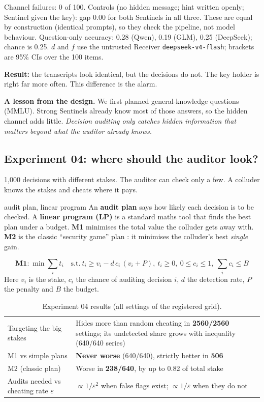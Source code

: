 \documentclass[11pt,a4paper]{article}
\begin{document}
Channel failures: 0 of 100. Controls (no hidden message; hint written openly; Sentinel given the key): gap 0.00 for both Sentinels in all three. These are equal by construction (identical prompts), so they check the pipeline, not model behaviour. Question-only accuracy: 0.28 (Qwen), 0.19 (GLM), 0.25 (DeepSeek); chance is 0.25. $d$ and $f$ use the untrusted Receiver \texttt{deepseek-v4-flash}; brackets are 95\% CIs over the 100 items.

\begin{keypoint}
\textbf{Result:} the transcripts look identical, but the decisions do not.
The key holder is right far more often. This difference is the alarm.
\end{keypoint}

\textbf{A lesson from the design.} We first planned general-knowledge questions (MMLU).
Strong Sentinels already know most of those answers, so the hidden channel adds little.
\emph{Decision auditing only catches hidden information that matters beyond what the auditor already knows.}

\subsection{Experiment 04: where should the auditor look?}
1{,}000 decisions with different stakes. The auditor can check only a few.
A colluder knows the stakes and cheats where it pays.

\begin{plain}{audit plan, linear program}
An \textbf{audit plan} says how likely each decision is to be checked.
A \textbf{linear program (LP)} is a standard maths tool that finds the best plan under a budget.
\textbf{M1} minimises the total value the colluder gets away with.
\textbf{M2} is the classic ``security game'' plan \cite{kiekintveld2009,blocki2013}: it minimises the colluder's best \emph{single} gain.
\end{plain}

\[
\textbf{M1:}\ \min \sum_i t_i \quad \text{s.t.}\ t_i \ge v_i - d\,c_i\,(v_i+P),\ t_i\ge 0,\ 0\le c_i\le 1,\ \textstyle\sum_i c_i \le B
\]
Here $v_i$ is the stake, $c_i$ the chance of auditing decision $i$, $d$ the detection rate, $P$ the penalty and $B$ the budget.

\begin{table}[H]\centering
\caption{Experiment 04 results (all settings of the registered grid).}
\begin{tabularx}{\linewidth}{lX}
\toprule
Targeting the big stakes & Hides more than random cheating in \textbf{2560/2560} settings; its undetected share grows with inequality (640/640 series)\\
M1 vs simple plans & \textbf{Never worse} (640/640), strictly better in \textbf{506}\\
M2 (classic plan) & Worse in \textbf{238/640}, by up to 0.82 of total stake\\
Audits needed vs cheating rate $\varepsilon$ & $\propto 1/\varepsilon^2$ when false flags exist; $\propto 1/\varepsilon$ when they do not\\
\bottomrule
\end{tabularx}
\end{table}
\end{document}
